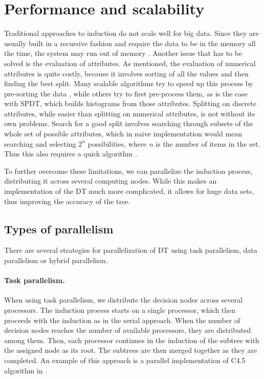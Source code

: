 \documentclass[thesis=B,english]{FITthesis}[2012/10/20]
\begin{document}
		\section{Performance and scalability}
		Traditional approaches to induction do not scale well for big data. Since they are usually built in a recursive fashion and require the data to be in the memory all the time, the system may run out of memory \cite{SCALABLE_RDF}. Another issue that has to be solved is the evaluation of attributes. As mentioned, the evaluation of numerical attributes is quite costly, because it involves sorting of all the values and then finding the best split. Many scalable algorithms try to speed up this process by pre-sorting the data \cite{mehta1996sliq,shafer1996sprint}, while others try to first pre-process them, as is the case with SPDT, which builds histograms from those attributes\cite{ben2010streaming}. Splitting on discrete attributes, while easier than splitting on numerical attributes, is not without its own problems. Search for a good split involves searching through subsets of the whole set of possible attributes, which in naive implementation would mean searching and selecting \(2^n\) possibilities, where \(n\) is the number of items in the set. Thus this also requires a quick algorithm \cite{mehta1996sliq}.

		To further overcome these limitations, we can parallelize the induction process, distributing it across several computing nodes. While this makes an implementation of the DT much more complicated, it allows for huge data sets, thus improving the accuracy of the tree.

		\subsection{Types of parallelism}
		There are several strategies for parallelization of DT using task parallelism, data parallelism or hybrid parallelism. \cite{PARALLEL_IMPLEMENTATION}
		\paragraph*{Task parallelism.} When using task parallelism, we distribute the decision nodes across several processors. The induction process starts on a single processor, which then proceeds with the induction as in the serial approach. When the number of decision nodes reaches the number of available processors, they are distributed among them. Then, each processor continues in the induction of the subtree with the assigned node as its root. The subtrees are then merged together as they are completed. An example of this approach is a parallel implementation of C4.5 algorithm in \cite{PARALLEL_INDUCTION}. 
\end{document}
